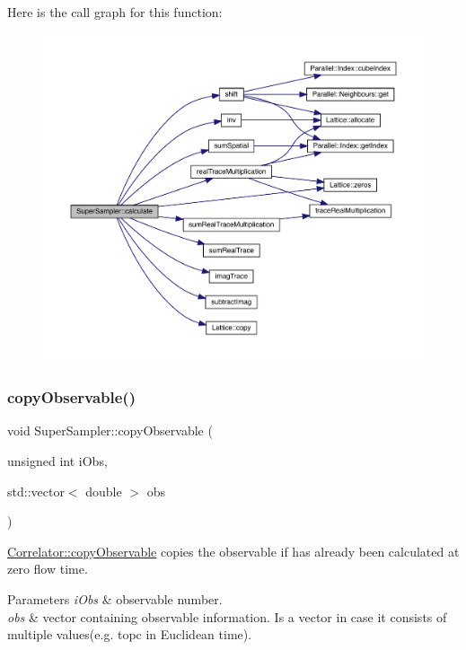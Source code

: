 Here is the call graph for this function\+:\nopagebreak
\begin{figure}[H]
\begin{center}
\leavevmode
\includegraphics[width=350pt]{class_super_sampler_a7e1457583270077c4fbcb288ea9b954c_cgraph}
\end{center}
\end{figure}
\mbox{\label{class_super_sampler_a9f9155a519b2f60f029e92f641f54c9c}} 
\subsubsection{\texorpdfstring{copyObservable()}{copyObservable()}}
{\footnotesize\ttfamily void Super\+Sampler\+::copy\+Observable (\begin{DoxyParamCaption}\item[{unsigned int}]{i\+Obs,  }\item[{std\+::vector$<$ double $>$}]{obs }\end{DoxyParamCaption})\hspace{0.3cm}{\ttfamily [virtual]}}



\mbox{\hyperlink{class_correlator_ac780d8b180294ee4801ede6e6a13f7f4}{Correlator\+::copy\+Observable}} copies the observable if has already been calculated at zero flow time. 


\begin{DoxyParams}{Parameters}
{\em i\+Obs} & observable number. \\
\hline
{\em obs} & vector containing observable information. Is a vector in case it consists of multiple values(e.\+g. topc in Euclidean time). \\
\hline
\end{DoxyParams}


